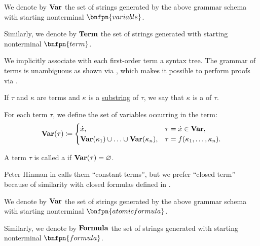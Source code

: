 \begin{definition}
\begin{thmenum}
     We denote by \( \op*{Var} \) the set of strings generated by the above grammar schema with starting nonterminal \( \bnfpn{variable} \).

     Similarly, we denote by \( \op*{Term} \) the set of strings generated with starting nonterminal \( \bnfpn{term} \).

    We implicitly associate with each first-order term a syntax tree. The grammar of terms is unambiguous as shown via , which makes it possible to perform proofs via .

     If \( \tau \) and \( \kappa \) are terms and \( \kappa \) is a \hyperref[def:formal_language/occurrence]{substring} of \( \tau \), we say that \( \kappa \) is a  of \( \tau \).

     For each term \( \tau \), we define the set of variables occurring in the term:
    \begin{equation}\label{eq:def:first_order_syntax/term_variables}
      \op*{Var}(\tau) \coloneqq \begin{cases}
        \synx,                                                            &\tau = \synx \in \op*{Var}, \\
        \op*{Var}(\kappa_1) \cup \ldots \cup \op*{Var}(\kappa_n), &\tau = f(\kappa_1, \ldots, \kappa_n).
      \end{cases}
    \end{equation}

     A term \( \tau \) is called a  if \( \op*{Var}(\tau) = \varnothing \).

    Peter Hinman in  calls them \enquote{constant terms}, but we prefer \enquote{closed term} because of similarity with closed formulas defined in .

     We denote by \( \op*{Var} \) the set of strings generated by the above grammar schema with starting nonterminal \( \bnfpn{atomic formula} \).

     Similarly, we denote by \( \op*{Formula} \) the set of strings generated with starting nonterminal \( \bnfpn{formula} \).


\end{thmenum}
\end{definition}
